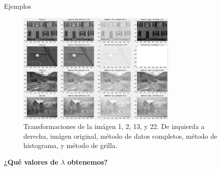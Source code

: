 \documentclass{beamer}
\begin{document}
\begin{frame}{Ejemplos}
    \begin{figure}[H]
        \centering
        \includegraphics[width=0.7\textwidth]{img_bci_all.png}
        \caption{Transformaciones de la im\'agen 1, 2, 13, y 22. De izquierda a derecha, im\'agen original, m\'etodo de datos completos, m\'etodo de histograma, y m\'etodo de grilla.}
        \label{fig:img_bci_all}
    \end{figure}
\end{frame}

\begin{frame}
    \begin{center}
        {\LARGE\bf ¿Qué valores de $\lambda$ obtenemos?}
    \end{center}
\end{frame}
\end{document}
